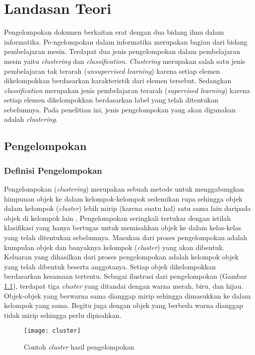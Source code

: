 \chapter{Landasan Teori}
\label{chap:teori}

Pengelompokan dokumen berkaitan erat dengan dua bidang ilmu dalam informatika. Pe-ngelompokan dalam informatika merupakan bagian dari bidang pembelajaran mesin. Terdapat dua jenis pengelompokan dalam pembelajaran mesin yaitu \textit{clustering} dan \textit{classification}. \textit{Clustering} merupakan salah satu jenis pembelajaran tak terarah (\textit{unsupervised learning}) karena setiap elemen dikelompokkan berdasarkan karakteristik dari elemen tersebut. Sedangkan \textit{classification} merupakan jenis pembelajaran terarah (\textit{supervised learning}) karena setiap elemen dikelompokkan berdasarkan label yang telah ditentukan sebelumnya. Pada penelitian ini, jenis pengelompokan yang akan digunakan adalah \textit{clustering}.

\section{Pengelompokan}
\subsection{Definisi Pengelompokan}
Pengelompokan (\textit{clustering}) merupakan sebuah metode untuk menggabungkan himpunan objek ke dalam kelompok-kelompok sedemikan rupa sehingga objek dalam kelompok (\textit{cluster}) lebih mirip (karena suatu hal) satu sama lain daripada objek di kelompok lain \cite{gan2007data}. Pengelompokan seringkali tertukar dengan istilah klasifikasi yang hanya bertugas untuk memisahkan objek ke dalam kelas-kelas yang telah ditentukan sebelumnya. Masukan dari proses pengelompokan adalah kumpulan objek dan banyaknya kelompok (\textit{cluster}) yang akan dibentuk. Keluaran yang dihasilkan dari proses pengelompokan adalah kelompok objek yang telah dibentuk beserta anggotanya. Setiap objek dikelompokkan berdasarkan kesamaan tertentu. Sebagai ilustrasi dari pengelompokan (Gambar \ref{fig:cluster}), terdapat tiga \textit{cluster} yang ditandai dengan warna merah, biru, dan hijau. Objek-objek yang berwarna sama dianggap mirip sehingga dimasukkan ke dalam kelompok yang sama. Begitu juga dengan objek yang berbeda warna dianggap tidak mirip sehingga perlu dipisahkan.

\begin{figure}[h]
	\begin{center}
		\texttt{[image: cluster]}
		\caption{Contoh \textit{cluster} hasil pengelompokan}
		\label{fig:cluster}
	\end{center}
\end{figure}


